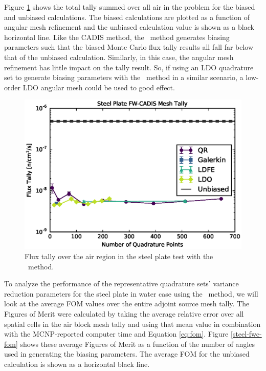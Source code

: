 Figure \ref{steel-fwc-tally} shows the total tally summed over all air in the
problem for the biased and unbiased calculations. The biased calculations are plotted
as a function of angular mesh refinement and the unbiased calculation value is shown
as a black horizontal line. Like the CADIS method, the \fwc\ method generates biasing
parameters such that the biased Monte Carlo flux tally results all fall far below that
of the unbiased calculation. Similarly, in this case, the angular mesh refinement has
little impact on the tally result. So, if using an LDO quadrature set to generate
biasing parameters with the \fwc\ method in a similar scenario, a low-order LDO
angular mesh could be used to good effect.

\begin{figure}[!htb]
\centering
\includegraphics[max height=0.445\textheight]{img/steel-plots/mcnp/fwc-tally.eps}
\caption{Flux tally over the air region in the steel plate test with the \fwc\ method.}
\label{steel-fwc-tally}
\end{figure}

To analyze the performance of the representative quadrature sets' variance reduction
parameters for the steel plate in water case using the \fwc\ method, we will look at
the average FOM values over the entire adjoint source mesh tally. The Figures of
Merit were calculated by taking the average relative error over all spatial cells in the
air block mesh tally and using that mean value in combination with the MCNP-reported 
computer time and Equation \ref{eq:fom}. Figure \ref{steel-fwc-fom} shows these
average Figures of Merit as a function of the number of angles used in generating the
biasing parameters. The average FOM for the unbiased calculation is shown as a
horizontal black line.

